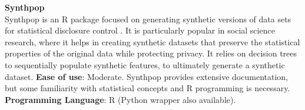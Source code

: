 \textbf{Synthpop} \\
Synthpop is an R package focused on generating synthetic versions of data sets for statistical disclosure control \cite{nowok2016synthpop}. It is particularly popular in social science research, where it helps in creating synthetic datasets that preserve the statistical properties of the original data while protecting privacy. It relies on decision trees to sequentially populate synthetic features, to ultimately generate a synthetic dataset. \textbf{Ease of use}: Moderate. Synthpop provides extensive documentation, but some familiarity with statistical concepts and R programming is necessary. \textbf{Programming Language}: R (Python wrapper also available). 
